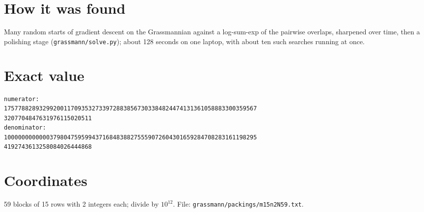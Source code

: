 \documentclass[11pt,a4paper]{article}
\begin{document}
\section{How it was found}
Many random starts of gradient descent on the Grassmannian against a log-sum-exp of the pairwise overlaps, sharpened over time, then a polishing stage (\texttt{grassmann/solve.py}); about 128 seconds on one laptop, with about ten such searches running at once.


\appendix
\section{Exact value}
{\small
\begin{verbatim}
numerator:
175778828932992001170935327339728838567303384824474131361058883300359567
3207704847631976115020511
denominator:
100000000000037980475959943716848388275559072604301659284708283161198295
4192743613258084026444868
\end{verbatim}}

\section{Coordinates}
59 blocks of 15 rows with 2 integers each; divide by $10^{12}$. File: \texttt{grassmann/packings/m15n2N59.txt}.
{\tiny
\begin{multicols}{4}
\end{multicols}}
\end{document}
